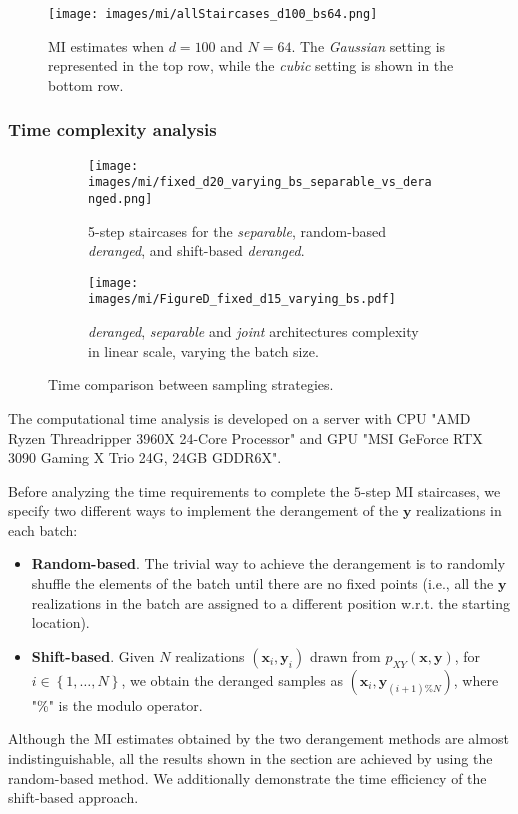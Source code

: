 \begin{figure}
	\centering
	\texttt{[image: images/mi/allStaircases\_d100\_bs64.png]}
	\caption{MI estimates when $d=100$ and $N=64$. The \textit{Gaussian} setting is represented in the top row, while the \textit{cubic} setting is shown in the bottom row.}
	\label{fig:MI_allStairs_d100_bs64}
\end{figure} 

\subsubsection{Time complexity analysis}
\label{subsubsec:mi_Appendix_time_analysis}

\begin{figure}
\centering
\begin{subfigure}{.5\textwidth}
 \centering
	\texttt{[image: images/mi/fixed\_d20\_varying\_bs\_separable\_vs\_deranged.png]}
	\caption{5-step staircases for the \textit{separable}, random-based \textit{deranged}, and shift-based \textit{deranged}.}
	\label{fig:MI_SeparableVsCombined_time_analysis}
\end{subfigure}%
\begin{subfigure}{.5\textwidth}
\centering
	\texttt{[image: images/mi/FigureD\_fixed\_d15\_varying\_bs.pdf]}
	\caption{\textit{deranged}, \textit{separable} and \textit{joint} architectures complexity in linear scale, varying the batch size.}
	\label{fig:MI_computationalTimeAnalysisMain_beyond}
\end{subfigure}
\caption{Time comparison between sampling strategies.}
\label{fig:MI_extra_time_appendix}
\end{figure}

The computational time analysis is developed on a server with CPU "AMD Ryzen Threadripper 3960X 24-Core Processor" and GPU "MSI GeForce RTX 3090 Gaming X Trio 24G, 24GB GDDR6X".

Before analyzing the time requirements to complete the $5$-step MI staircases, we specify two different ways to implement the derangement of the $\mathbf{y}$ realizations in each batch:
\begin{itemize}
    \item \textbf{Random-based}. The trivial way to achieve the derangement is to randomly shuffle the elements of the batch until there are no fixed points (i.e., all the $\mathbf{y}$ realizations in the batch are assigned to a different position w.r.t. the starting location).
    \item \textbf{Shift-based}. Given $N$ realizations $(\mathbf{x}_i, \mathbf{y}_i)$ drawn from $p_{XY}(\mathbf{x},\mathbf{y})$, for $i \in \left\{ 1, \dotsc, N \right\}$, we obtain the deranged samples as $(\mathbf{x}_i, \mathbf{y}_{(i+1)\%N})$, where "\%" is the modulo operator. 
\end{itemize}
Although the MI estimates obtained by the two derangement methods are almost indistinguishable, all the results shown in the section are achieved by using the random-based method. We additionally demonstrate the time efficiency of the shift-based approach. 


